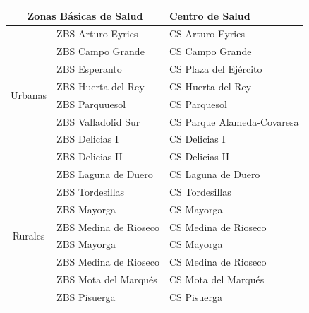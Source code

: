 \begin{table}[H]
    \centering
    \begin{tabular}{cll}
        \toprule
        \multicolumn{2}{c}{Zonas Básicas de Salud} & Centro de Salud                                      \\
        \midrule
        \multirow{8}{*}{Urbanas}                   & ZBS Arturo Eyries       & CS Arturo Eyries           \\
                                                   & ZBS Campo Grande        & CS Campo Grande            \\
                                                   & ZBS Esperanto           & CS Plaza del Ejército      \\
                                                   & ZBS Huerta del Rey      & CS Huerta del Rey          \\
                                                   & ZBS Parquuesol          & CS Parquesol               \\
                                                   & ZBS Valladolid Sur      & CS Parque Alameda-Covaresa \\
                                                   & ZBS Delicias I          & CS Delicias I              \\
                                                   & ZBS Delicias II         & CS Delicias II             \\
        \midrule
        \multirow{11}{*}{Rurales}                  & ZBS Laguna de Duero     & CS Laguna de Duero         \\
                                                   & ZBS Tordesillas         & CS Tordesillas             \\
                                                   & ZBS Mayorga             & CS Mayorga                 \\
                                                   & ZBS Medina de Rioseco   & CS Medina de Rioseco       \\
                                                   & ZBS Mayorga             & CS Mayorga                 \\
                                                   & ZBS Medina de Rioseco   & CS Medina de Rioseco       \\
                                                   & ZBS Mota del Marqués    & CS Mota del Marqués        \\
                                                   & ZBS Pisuerga            & CS Pisuerga                \\

\end{tabular}
\end{table}
